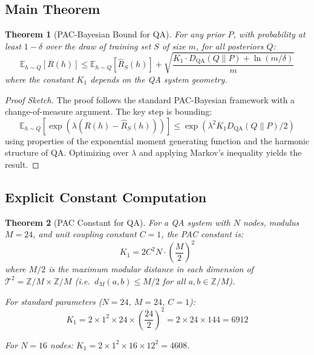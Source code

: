 \documentclass[11pt]{article}
\newtheorem{theorem}{Theorem}[section]
\theoremstyle{remark}
\begin{document}
\subsection{Main Theorem}

\begin{theorem}[PAC-Bayesian Bound for QA]
\label{thm:pac_bayes_qa}
For any prior $P$, with probability at least $1 - \delta$ over the draw of training set $S$ of size $m$, for all posteriors $Q$:
\begin{equation}
\mathbb{E}_{h \sim Q}[R(h)] \leq \mathbb{E}_{h \sim Q}[\hat{R}_S(h)] + \sqrt{\frac{K_1 \cdot D_{\text{QA}}(Q \| P) + \ln(m/\delta)}{m}}
\end{equation}
where the constant $K_1$ depends on the QA system geometry.
\end{theorem}

\begin{proof}[Proof Sketch]
The proof follows the standard PAC-Bayesian framework \cite{mcallester1999pac} with a change-of-measure argument. The key step is bounding:
\begin{equation}
\mathbb{E}_{h \sim Q}[\exp(\lambda(R(h) - \hat{R}_S(h)))] \leq \exp\left(\lambda^2 K_1 D_{\text{QA}}(Q \| P) / 2\right)
\end{equation}
using properties of the exponential moment generating function and the harmonic structure of QA. Optimizing over $\lambda$ and applying Markov's inequality yields the result.
\end{proof}

\subsection{Explicit Constant Computation}

\begin{theorem}[PAC Constant for QA]
\label{thm:pac_constant}
For a QA system with $N$ nodes, modulus $M = 24$, and unit coupling constant $C = 1$, the PAC constant is:
\begin{equation}
K_1 = 2 C^2 N \cdot \left(\frac{M}{2}\right)^2
\end{equation}
where $M/2$ is the maximum modular distance in each dimension of $\mathcal{T}^2 = \mathbb{Z}/M \times \mathbb{Z}/M$ (i.e.\ $d_M(a,b) \leq M/2$ for all $a, b \in \mathbb{Z}/M$).

For standard parameters ($N = 24$, $M = 24$, $C = 1$):
\begin{equation}
K_1 = 2 \times 1^2 \times 24 \times \left(\frac{24}{2}\right)^2 = 2 \times 24 \times 144 = 6912
\end{equation}

For $N = 16$ nodes: $K_1 = 2 \times 1^2 \times 16 \times 12^2 = 4608$.
\end{theorem}
\end{document}
